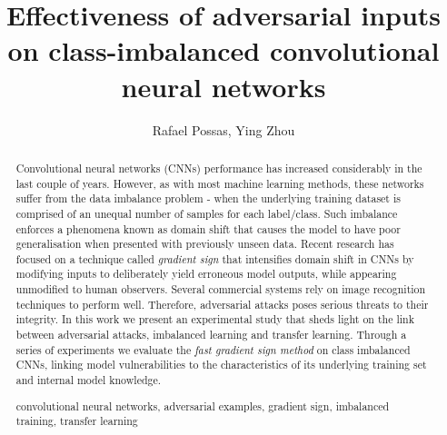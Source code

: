\documentclass[runningheads,a4paper]{llncs}
\newcommand{\keywords}[1]{\par\addvspace\baselineskip
\noindent\keywordname\enspace\ignorespaces#1}
\begin{document}
\mainmatter  %

\title{Effectiveness of adversarial inputs on class-imbalanced convolutional neural networks}

%
%
\author{Rafael Possas, Ying Zhou}
%


%
%

\maketitle


\begin{abstract}
Convolutional neural networks (CNNs) performance has increased considerably in the last couple of years. However, as with most machine learning methods, these networks suffer from the data imbalance problem - when the underlying training dataset is comprised of an unequal number of samples for each label/class. Such imbalance enforces a phenomena known as domain shift that causes the model to have poor generalisation when presented with previously unseen data. Recent research has focused on a technique called \textit{gradient sign} that intensifies domain shift in CNNs by modifying inputs to deliberately yield erroneous model outputs, while appearing unmodified to human observers. Several commercial systems rely on image recognition techniques to perform well. Therefore, adversarial attacks poses serious threats to their integrity. In this work we present an experimental study that sheds light on the link between adversarial attacks, imbalanced learning and transfer learning. Through a series of experiments we evaluate the \textit{fast gradient sign method} on class imbalanced CNNs, linking model vulnerabilities to the characteristics of its underlying training set and internal model knowledge.
\keywords{convolutional neural networks, adversarial examples, gradient sign, imbalanced training, transfer learning}
\end{abstract}
\end{document}
